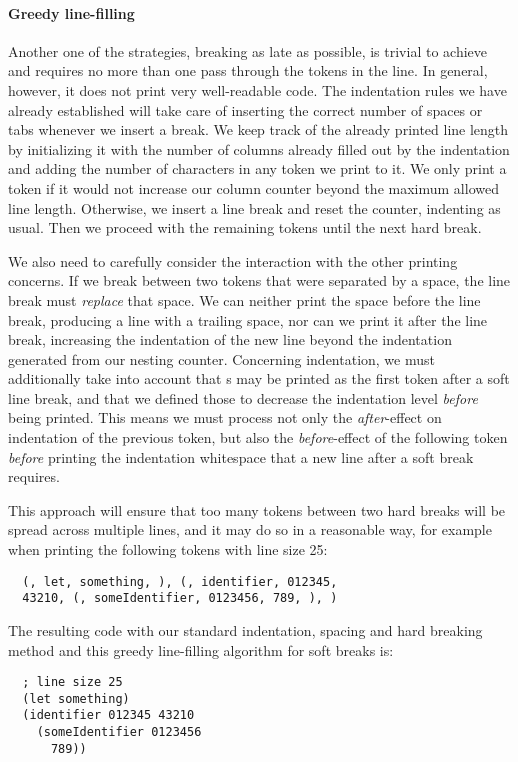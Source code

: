 \paragraph{Greedy line-filling}
Another one of the strategies, breaking as late as possible,
is trivial to achieve and requires no more than one pass through the tokens in the line.
In general, however, it does not print very well-readable code.
The indentation rules we have already established will take care of inserting
the correct number of spaces or tabs whenever we insert a break.
We keep track of the already printed line length by initializing it with the
number of columns already filled out by the indentation and adding the number
of characters in any token we print to it.
We only print a token if it would not increase our column counter beyond
the maximum allowed line length.
Otherwise, we insert a line break and reset the counter, indenting as usual.
Then we proceed with the remaining tokens until the next hard break.

We also need to carefully consider the interaction with the other printing concerns.
If we break between two tokens that were separated by a space,
the line break must \textit{replace} that space.
We can neither print the space before the line break, producing a line with a trailing space,
nor can we print it after the line break, increasing the indentation of the new line
beyond the indentation generated from our nesting counter.
Concerning indentation, we must additionally take into account that s
may be printed as the first token after a soft line break,
and that we defined those to decrease the indentation level \textit{before} being printed.
This means we must process not only the \textit{after}-effect on indentation of the previous token,
but also the \textit{before}-effect of the following token \textit{before}
printing the indentation whitespace that a new line after a soft break requires.

This approach will ensure that too many tokens between two hard breaks will be spread
across multiple lines, and it may do so in a reasonable way,
for example when printing the following tokens with line size 25:
\begin{verbatim}
  (, let, something, ), (, identifier, 012345,
  43210, (, someIdentifier, 0123456, 789, ), )
\end{verbatim}
The resulting code with our standard indentation, spacing and hard breaking method
and this greedy line-filling algorithm for soft breaks is:
\begin{verbatim}
  ; line size 25
  (let something)
  (identifier 012345 43210
    (someIdentifier 0123456
      789))
\end{verbatim}
